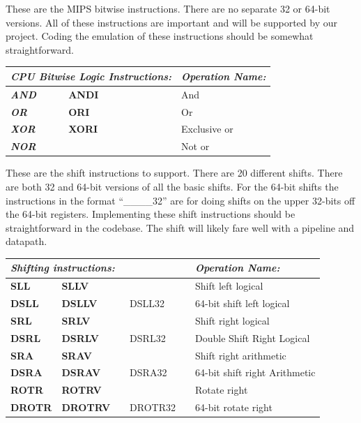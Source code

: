 \documentclass[parskip=half, fontsize=12pt]{scrartcl}
\begin{document}
These are the MIPS bitwise instructions. There are no separate 32 or
64-bit versions. All of these instructions are important and will be
supported by our project. Coding the emulation of these instructions
should be somewhat straightforward.

\begin{tabularx}{\textwidth}{@{}lllll|X@{}}
    \multicolumn{5}{l|}{\emph{CPU Bitwise Logic Instructions:}} & \emph{Operation Name:} \\\hline
    \emph{\textbf{AND}} & \textbf{ANDI} & & &                   & And \\
    \emph{\textbf{OR}} & \textbf{ORI} & & &                     & Or \\
    \emph{\textbf{XOR}} & \textbf{XORI} & & &                   & Exclusive or \\
    \emph{\textbf{NOR}} & & & &                                 & Not or \\
\end{tabularx}

These are the shift instructions to support. There are 20 different
shifts. There are both 32 and 64-bit versions of all the basic shifts.
For the 64-bit shifts the instructions in the format ``\_\_\_\_32'' are
for doing shifts on the upper 32-bits off the 64-bit registers.
Implementing these shift instructions should be straightforward in the
codebase. The shift will likely fare well with a pipeline and datapath.

\begin{tabularx}{\textwidth}{@{}lllll|X@{}}
    \multicolumn{5}{l|}{\emph{Shifting instructions:}} & \emph{Operation Name:} \\\hline
    \textbf{SLL} & \textbf{SLLV} & & &                 & Shift left logical \\
    \textbf{DSLL} & \textbf{DSLLV} & & DSLL32 &        & 64-bit shift left logical \\
    \textbf{SRL} & \textbf{SRLV} & & &                 & Shift right logical \\
    \textbf{DSRL} & \textbf{DSRLV} & & DSRL32 &        & Double Shift Right Logical \\
    \textbf{SRA} & \textbf{SRAV} & & &                 & Shift right arithmetic \\
    \textbf{DSRA} & \textbf{DSRAV} & & DSRA32 &        & 64-bit shift right Arithmetic \\
    \textbf{ROTR} & \textbf{ROTRV} & & &               & Rotate right \\
    \textbf{DROTR} & \textbf{DROTRV} & & DROTR32 &     & 64-bit rotate right \\
\end{tabularx}
\end{document}
